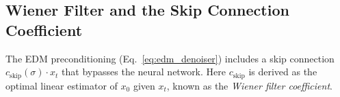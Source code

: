 
\subsection{Wiener Filter and the Skip Connection Coefficient}
\label{app:subsec:wiener}

The EDM preconditioning (Eq.\ \ref{eq:edm_denoiser}) includes a skip connection
$c_{\text{skip}}(\sigma)\cdot x_t$ that bypasses the neural network. Here $c_{\text{skip}}$ is derived as the optimal linear estimator of $x_0$ given $x_t$,
known as the \textit{Wiener filter coefficient}.\\


